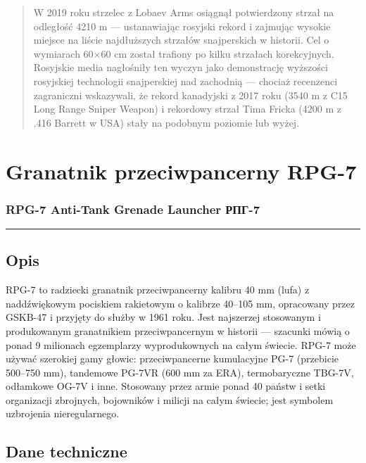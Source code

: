 \documentclass[12pt,openany,oneside]{book}
\begin{document}
\begin{quote}
W 2019 roku strzelec z Lobaev Arms osiągnął potwierdzony strzał na
odległość 4210 m --- ustanawiając rosyjski rekord i zajmując wysokie
miejsce na liście najdłuższych strzałów snajperskich w historii. Cel o
wymiarach 60×60 cm został trafiony po kilku strzałach korekcyjnych.
Rosyjskie media nagłośniły ten wyczyn jako demonstrację wyższości
rosyjskiej technologii snajperskiej nad zachodnią --- chociaż recenzenci
zagraniczni wskazywali, że rekord kanadyjski z 2017 roku (3540 m z C15
Long Range Sniper Weapon) i rekordowy strzał Tima Fricka (4200 m z .416
Barrett w USA) stały na podobnym poziomie lub wyżej.
\end{quote}

\chapter{Granatnik przeciwpancerny
RPG-7}\label{granatnik-przeciwpancerny-rpg-7}

\subsection{RPG-7 Anti-Tank Grenade Launcher \textbar{}
РПГ-7}\label{rpg-7-anti-tank-grenade-launcher-ux440ux43fux433-7}

\begin{center}\rule{0.5\linewidth}{0.5pt}\end{center}

\section{Opis}\label{opis-68}

RPG-7 to radziecki granatnik przeciwpancerny kalibru 40 mm (lufa) z
naddźwiękowym pociskiem rakietowym o kalibrze 40--105 mm, opracowany
przez GSKB-47 i przyjęty do służby w 1961 roku. Jest najszerzej
stosowanym i produkowanym granatnikiem przeciwpancernym w historii ---
szacunki mówią o ponad 9 milionach egzemplarzy wyprodukownych na całym
świecie. RPG-7 może używać szerokiej gamy głowic: przeciwpancerne
kumulacyjne PG-7 (przebicie 500--750 mm), tandemowe PG-7VR (600 mm za
ERA), termobaryczne TBG-7V, odłamkowe OG-7V i inne. Stosowany przez
armie ponad 40 państw i setki organizacji zbrojnych, bojowników i
milicji na całym świecie; jest symbolem uzbrojenia nieregularnego.

\section{Dane techniczne}\label{dane-techniczne-68}
\end{document}
